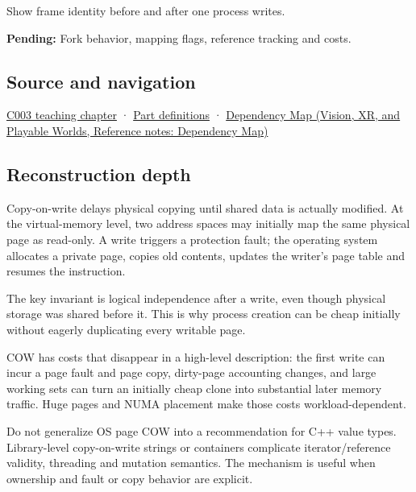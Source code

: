 Show frame identity before and after one process writes.

\textbf{Pending:} Fork behavior, mapping flags, reference tracking and costs.

\subsection{Source and navigation}\label{appendix-7a06e5baac04-source-and-navigation}

\hyperref[01-foundations-i-ch002-where-the-bytes-live]{C003 teaching chapter} · \hyperref[appendix-fd090d982a15-m003---parts-41-60]{Part definitions} · \href{../07-Vision-XR-and-Playable-Worlds/main.pdf\#nameddest=appendix-4ad47bdd269a}{Dependency Map (Vision, XR, and Playable Worlds, Reference notes: Dependency Map)}

\subsection{Reconstruction depth}\label{appendix-7a06e5baac04-reconstruction-depth}

Copy-on-write delays physical copying until shared data is actually modified. At the virtual-memory level, two address spaces may initially map the same physical page as read-only. A write triggers a protection fault; the operating system allocates a private page, copies old contents, updates the writer's page table and resumes the instruction.

The key invariant is logical independence after a write, even though physical storage was shared before it. This is why process creation can be cheap initially without eagerly duplicating every writable page.

COW has costs that disappear in a high-level description: the first write can incur a page fault and page copy, dirty-page accounting changes, and large working sets can turn an initially cheap clone into substantial later memory traffic. Huge pages and NUMA placement make those costs workload-dependent.

Do not generalize OS page COW into a recommendation for C++ value types. Library-level copy-on-write strings or containers complicate iterator/reference validity, threading and mutation semantics. The mechanism is useful when ownership and fault or copy behavior are explicit.

